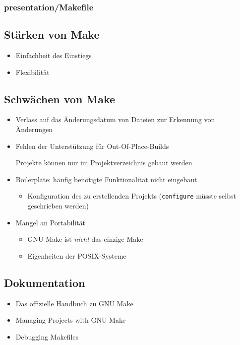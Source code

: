 \begin{frame}
	\frametitle{presentation/Makefile}
\end{frame}

\subsection{Stärken von Make}
\begin{frame}
	\begin{itemize}
		\item Einfachheit des Einstiegs
		\item Flexibilität
	\end{itemize}
\end{frame}

\subsection{Schwächen von Make}
\begin{frame}
	\begin{itemize}
		\item Verlass auf das Änderungsdatum von Dateien zur Erkennung von Änderungen
		\item Fehlen der Unterstützung für Out-Of-Place-Builds

			Projekte können nur im Projektverzeichnis gebaut werden
		\item Boilerplate: häufig benötigte Funktionalität nicht eingebaut
			\begin{itemize}
				\item Konfiguration des zu erstellenden Projekts (\texttt{configure} müsste selbst geschrieben werden)
			\end{itemize}
		\item Mangel an Portabilität
			\begin{itemize}
				\item GNU Make ist \emph{nicht} das einzige Make
				\item Eigenheiten der POSIX-Systeme
			\end{itemize}
	\end{itemize}
\end{frame}

\subsection{Dokumentation}
\begin{frame}
	\begin{itemize}
	\item Das offizielle Handbuch zu GNU Make \cite{GNU_Make_manual}
	\item Managing Projects with GNU Make \cite{OreillyMake}
	\item Debugging Makefiles \cite{DobbsDebuggingMakefiles}
	\end{itemize}
\end{frame}
